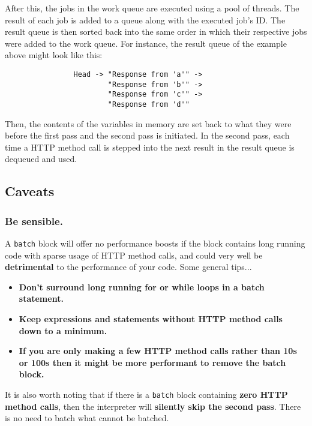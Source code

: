 \documentclass[12pt, letterpaper]{article}
\begin{document}
After this, the jobs in the work queue are executed using a pool of threads. The result of each job is added to a queue along with the executed job's ID. The result queue is then sorted back into the same order in which their respective jobs were added to the work queue. For instance, the result queue of the example above might look like this:

\begin{center}
    \begin{verbatim}
                Head -> "Response from 'a'" ->
                        "Response from 'b'" ->
                        "Response from 'c'" ->
                        "Response from 'd'"
    \end{verbatim}
\end{center}

Then, the contents of the variables in memory are set back to what they were before the first pass and the second pass is initiated. In the second pass, each time a HTTP method call is stepped into the next result in the result queue is dequeued and used.

\subsection{Caveats}

\subsubsection{Be sensible.}

A \verb|batch| block will offer no performance boosts if the block contains long running code with sparse usage of HTTP method calls, and could very well be \textbf{detrimental} to the performance of your code. Some general tips...

\begin{itemize}
    \item \textbf{Don't surround long running for or while loops in a batch statement.}
    \item \textbf{Keep expressions and statements without HTTP method calls down to a minimum.}
    \item \textbf{If you are only making a few HTTP method calls rather than 10s or 100s then it might be more performant to remove the batch block.}
\end{itemize}

It is also worth noting that if there is a \verb|batch| block containing \textbf{zero HTTP method calls}, then the interpreter will \textbf{silently skip the second pass}. There is no need to batch what cannot be batched.
\end{document}
